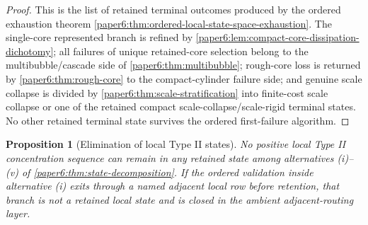 \documentclass[11pt]{amsart}
\theoremstyle{plain}
\newtheorem{proposition}[proposition]{Proposition}
\theoremstyle{definition}
\theoremstyle{remark}
\begin{document}
\begin{proof}
This is the list of retained terminal outcomes produced by the ordered
exhaustion theorem \cref{paper6:thm:ordered-local-state-space-exhaustion}.  The
single-core represented branch is refined by
\cref{paper6:lem:compact-core-dissipation-dichotomy}; all failures of unique
retained-core selection belong to the multibubble/cascade side of
\cref{paper6:thm:multibubble}; rough-core loss is returned by
\cref{paper6:thm:rough-core} to the compact-cylinder failure side; and genuine
scale collapse is divided by \cref{paper6:thm:scale-stratification} into
finite-cost scale collapse or one of the retained compact
scale-collapse/scale-rigid terminal states.  No other retained terminal state
survives the ordered first-failure algorithm.
\end{proof}

\begin{proposition}[Elimination of local Type II states]
\label{paper6:prop:state-elimination}
No positive local Type II concentration sequence can remain in any retained
state among alternatives \textup{(i)}--\textup{(v)} of
\cref{paper6:thm:state-decomposition}.  If the ordered validation inside
alternative \textup{(i)} exits through a named adjacent local row before
retention, that branch is not a retained local state and is closed in the
ambient adjacent-routing layer.
\end{proposition}
\end{document}
